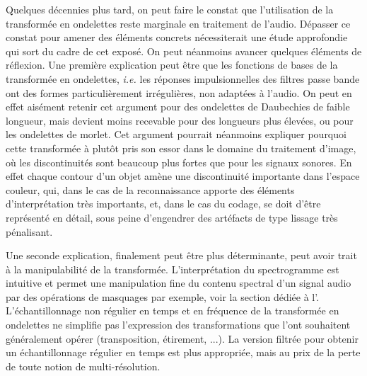 Quelques décennies plus tard, on peut faire le constat que l'utilisation de la transformée en ondelettes reste marginale en traitement de l'audio. Dépasser ce constat pour amener des éléments concrets nécessiterait une étude approfondie qui sort du cadre de cet exposé. On peut néanmoins avancer quelques éléments de réflexion. Une première explication peut être que les fonctions de bases de la transformée en ondelettes, \textit{i.e.} les réponses impulsionnelles des filtres passe bande ont des formes particulièrement irrégulières, non adaptées à l'audio. On peut en effet aisément retenir cet argument pour des ondelettes de Daubechies de faible longueur, mais devient moins recevable pour des longueurs plus élevées, ou pour les ondelettes de morlet. Cet argument pourrait néanmoins expliquer pourquoi cette transformée à plutôt pris son essor dans le domaine du traitement d'image, où les discontinuités sont beaucoup plus fortes que pour les signaux sonores. En effet chaque contour d'un objet amène une discontinuité importante dans l'espace couleur, qui, dans le cas de la reconnaissance apporte des éléments d'interprétation très importants, et, dans le cas du codage, se doit d'être représenté en détail, sous peine d'engendrer des artéfacts de type \og lissage \fg très pénalisant.

Une seconde explication, finalement peut être plus déterminante, peut avoir trait à la manipulabilité de la transformée. L'interprétation  du spectrogramme est intuitive et permet une manipulation fine du contenu spectral d'un signal audio par des opérations de masquages par exemple, voir la section dédiée à l'. L'échantillonnage non régulier en temps et en fréquence de la transformée en ondelettes ne simplifie pas l'expression des transformations que l'ont souhaitent généralement opérer (transposition, étirement, ...). La version filtrée pour obtenir un échantillonnage régulier en temps est plus appropriée, mais au prix de la perte de toute notion de multi-résolution.


